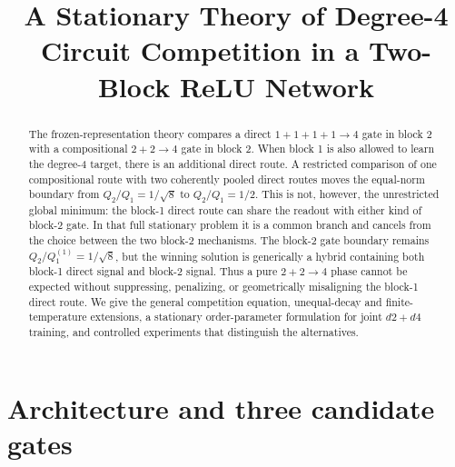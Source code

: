 \documentclass[11pt]{article}
\title{A Stationary Theory of Degree-4 Circuit Competition in a Two-Block ReLU Network}
\author{}
\date{}
\begin{document}
\maketitle

\begin{abstract}
The frozen-representation theory compares a direct \(1+1+1+1\to4\) gate in block 2 with a
compositional \(2+2\to4\) gate in block 2.  When block 1 is also allowed to learn the degree-4
target, there is an additional direct route.  A restricted comparison of one compositional
route with two coherently pooled direct routes moves the equal-norm boundary from
\(Q_2/Q_1=1/\sqrt8\) to \(Q_2/Q_1=1/2\).  This is not, however, the unrestricted global
minimum: the block-1 direct route can share the readout with either kind of block-2 gate.  In
that full stationary problem it is a common branch and cancels from the choice between the two
block-2 mechanisms.  The block-2 gate boundary remains \(Q_2/Q_1^{(1)}=1/\sqrt8\), but the
winning solution is generically a hybrid containing both block-1 direct signal and block-2
signal.  Thus a pure \(2+2\to4\) phase cannot be expected without suppressing, penalizing, or
geometrically misaligning the block-1 direct route.  We give the general competition equation,
unequal-decay and finite-temperature extensions, a stationary order-parameter formulation for
joint \(d2+d4\) training, and controlled experiments that distinguish the alternatives.
\end{abstract}

\section{Architecture and three candidate gates}
\end{document}
